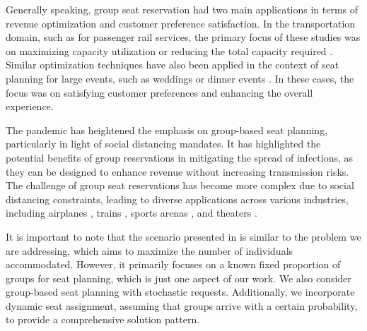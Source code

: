 Generally speaking, group seat reservation had two main applications in terms of revenue optimization and customer preference satisfaction. In the transportation domain, such as for passenger rail services, the primary focus of these studies was on maximizing capacity utilization or reducing the total capacity required \cite{clausen2010off, deplano2019offline}. Similar optimization techniques have also been applied in the context of seat planning for large events, such as weddings or dinner events \cite{lewis2016creating}. In these cases, the focus was on satisfying customer preferences and enhancing the overall experience.

The pandemic has heightened the emphasis on group-based seat planning, particularly in light of social distancing mandates. It has highlighted the potential benefits of group reservations in mitigating the spread of infections, as they can be designed to enhance revenue without increasing transmission risks. The challenge of group seat reservations has become more complex due to social distancing constraints, leading to diverse applications across various industries, including airplanes \cite{salari2022social}, trains \cite{haque2023social}, sports arenas \cite{kwag2022optimal}, and theaters \cite{blom2022filling}.

It is important to note that the scenario presented in \cite{blom2022filling} is similar to the problem we are addressing, which aims to maximize the number of individuals accommodated. However, it primarily focuses on a known fixed proportion of groups for seat planning, which is just one aspect of our work. We also consider group-based seat planning with stochastic requests. Additionally, we incorporate dynamic seat assignment, assuming that groups arrive with a certain probability, to provide a comprehensive solution pattern.




